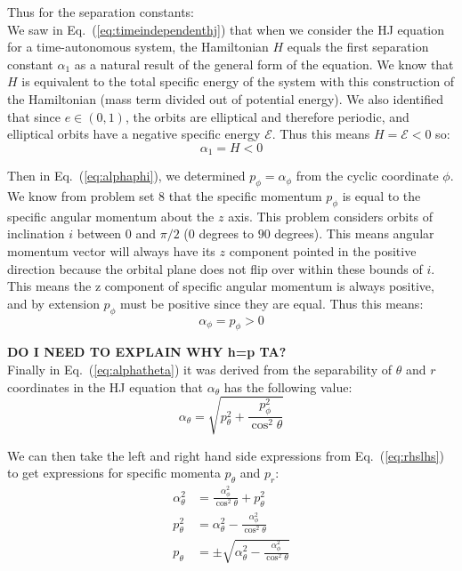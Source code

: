 \documentclass[titlepage]{article}
\begin{document}
\begin{mdframed}[linewidth=1pt, innertopmargin=10pt, innerbottommargin=10pt]
	Thus for the separation constants:\\
	
	We saw in Eq.~(\ref{eq:timeindependenthj}) that when we consider the HJ equation for a time-autonomous system, the Hamiltonian $H$ equals the first separation constant $\alpha_1$ as a natural result of the general form of the equation. We know that $H$ is equivalent to the total specific energy of the system with this construction of the Hamiltonian (mass term divided out of potential energy). We also identified that since $e\in(0,1)$, the orbits are elliptical and therefore periodic, and elliptical orbits have a negative specific energy $\mathcal{E}$. Thus this means $H=\mathcal{E}<0$ so:
	\begin{equation}
		\alpha_1=H<0
	\end{equation}
	
	Then in Eq.~(\ref{eq:alphaphi}), we determined $p_\phi=\alpha_\phi$ from the cyclic coordinate $\phi$. We know from problem set 8 that the specific momentum $p_\phi$ is equal to the specific angular momentum about the $z$ axis. This problem considers orbits of inclination $i$ between $0$ and $\pi/2$ ($0$ degrees to $90$ degrees). This means angular momentum vector will always have its $z$ component pointed in the positive direction because the orbital plane does not flip over within these bounds of $i$. This means the z component of specific angular momentum is always positive, and by extension $p_\phi$ must be positive since they are equal. Thus this means:
	\begin{equation}
		\alpha_\phi=p_\phi>0
	\end{equation}
	
	\textbf{DO I NEED TO EXPLAIN WHY h=p TA?} \\
	
	Finally in Eq.~(\ref{eq:alphatheta}) it was derived from the separability of $\theta$ and $r$ coordinates in the HJ equation that $\alpha_\theta$ has the following value:
	\begin{equation}
		\alpha_\theta=\sqrt{p_\theta^2+\frac{p_\phi^2}{\cos^2\theta}}
	\end{equation}
\end{mdframed}

We can then take the left and right hand side expressions from Eq.~(\ref{eq:rhslhs}) to get expressions for specific momenta $p_\theta$ and $p_r$:
\begin{equation}
	\begin{split}
		\alpha_\theta^2&=\frac{\alpha_\phi^2}{\cos^2\theta}+p_\theta^2 \\
		p_\theta^2&=\alpha_\theta^2-\frac{\alpha_\phi^2}{\cos^2\theta} \\
		p_\theta&=\pm\sqrt{\alpha_\theta^2-\frac{\alpha_\phi^2}{\cos^2\theta}}
	\end{split}
\end{equation}
\end{document}
